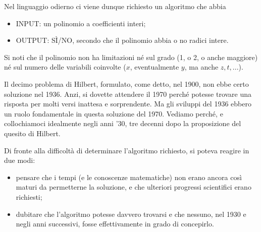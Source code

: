 Nel linguaggio odierno ci viene dunque richiesto un algoritmo che abbia

\begin{itemize}
    \item INPUT: un polinomio a coefficienti interi;
    \item OUTPUT: SÌ/NO, secondo che il polinomio abbia o no radici intere.
\end{itemize}

Si noti che il polinomio non ha limitazioni né sul grado (1, o 2, o anche maggiore)
né sul numero delle variabili coinvolte ($x$, eventualmente $y$, ma anche $z, t, ...$).

Il decimo problema di Hilbert, formulato, come detto, nel 1900, non ebbe certo
soluzione nel 1936. Anzi, si dovette attendere il 1970 perché potesse trovare
una risposta per molti versi inattesa e sorprendente. Ma gli sviluppi del 1936
ebbero un ruolo fondamentale in questa soluzione del 1970. Vediamo perché,
e collochiamoci idealmente negli anni '30, tre decenni dopo la proposizione del
quesito di Hilbert.

Di fronte alla difficoltà di determinare l'algoritmo richiesto, si poteva reagire in
due modi:

\begin{itemize}
    \item pensare che i tempi (e le conoscenze matematiche) non erano ancora così maturi
          da permetterne la soluzione, e che ulteriori progressi scientifici erano richiesti;
    \item  dubitare che l'algoritmo potesse davvero trovarsi e che nessuno, nel 1930 e
          negli anni successivi, fosse effettivamente in grado di concepirlo.
\end{itemize}

